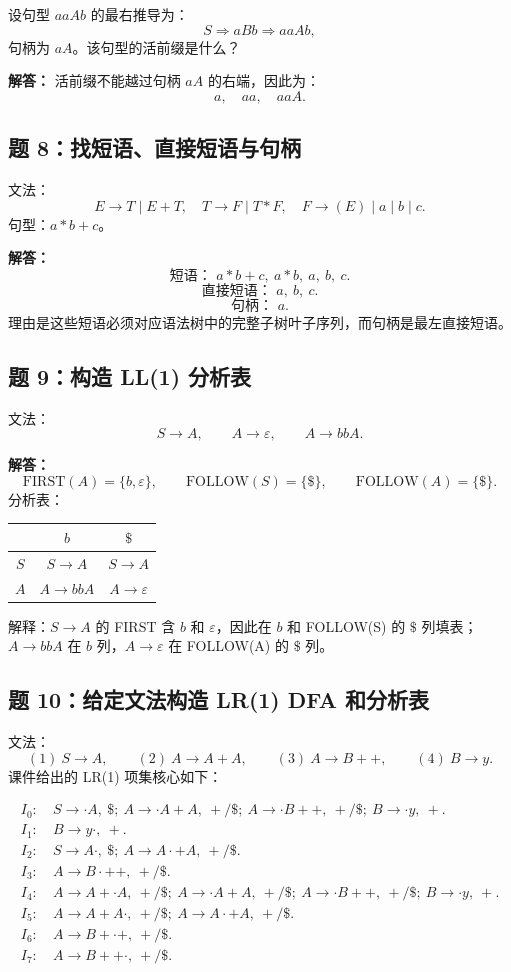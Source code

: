 \documentclass[UTF8,fontset=none,11pt]{ctexart}
\newcommand{\eps}{\varepsilon}
\newcommand{\FIRST}{\ensuremath{\mathrm{FIRST}}}
\newcommand{\FOLLOW}{\ensuremath{\mathrm{FOLLOW}}}
\begin{document}
设句型 \(aaAb\) 的最右推导为：
\[
S\Rightarrow aBb\Rightarrow aaAb,
\]
句柄为 \(aA\)。该句型的活前缀是什么？

\textbf{解答：} 活前缀不能越过句柄 \(aA\) 的右端，因此为：
\[
a,\quad aa,\quad aaA.
\]

\subsection*{题 8：找短语、直接短语与句柄}

文法：
\[
E\to T\mid E+T,\quad T\to F\mid T*F,\quad F\to (E)\mid a\mid b\mid c.
\]
句型：\(a*b+c\)。

\textbf{解答：}
\[
\text{短语： } a*b+c,\ a*b,\ a,\ b,\ c.
\]
\[
\text{直接短语： } a,\ b,\ c.
\]
\[
\text{句柄： } a.
\]
理由是这些短语必须对应语法树中的完整子树叶子序列，而句柄是最左直接短语。

\subsection*{题 9：构造 LL(1) 分析表}

文法：
\[
S\to A,\qquad A\to\eps,\qquad A\to bbA.
\]

\textbf{解答：}
\[
\FIRST(A)=\{b,\eps\},\qquad \FOLLOW(S)=\{\$\},\qquad \FOLLOW(A)=\{\$\}.
\]
分析表：

\begin{center}
\begin{tabular}{c|cc}
\toprule
 & \(b\) & \(\$\) \\
\midrule
\(S\) & \(S\to A\) & \(S\to A\) \\
\(A\) & \(A\to bbA\) & \(A\to\eps\) \\
\bottomrule
\end{tabular}
\end{center}

解释：\(S\to A\) 的 FIRST 含 \(b\) 和 \(\eps\)，因此在 \(b\) 和 FOLLOW(S) 的 \(\$\) 列填表；\(A\to bbA\) 在 \(b\) 列，\(A\to\eps\) 在 FOLLOW(A) 的 \(\$\) 列。

\subsection*{题 10：给定文法构造 LR(1) DFA 和分析表}

文法：
\[
(1)\ S\to A,\qquad
(2)\ A\to A+A,\qquad
(3)\ A\to B++,\qquad
(4)\ B\to y.
\]
课件给出的 LR(1) 项集核心如下：

\[
\begin{aligned}
I_0:&\ S\to\cdot A,\ \$;\ A\to\cdot A+A,\ +/\$;\ A\to\cdot B++,\ +/\$;\ B\to\cdot y,\ +.\\
I_1:&\ B\to y\cdot,\ +.\\
I_2:&\ S\to A\cdot,\ \$;\ A\to A\cdot +A,\ +/\$.\\
I_3:&\ A\to B\cdot ++,\ +/\$.\\
I_4:&\ A\to A+\cdot A,\ +/\$;\ A\to\cdot A+A,\ +/\$;\ A\to\cdot B++,\ +/\$;\ B\to\cdot y,\ +.\\
I_5:&\ A\to A+A\cdot,\ +/\$;\ A\to A\cdot +A,\ +/\$.\\
I_6:&\ A\to B+\cdot +,\ +/\$.\\
I_7:&\ A\to B++\cdot,\ +/\$.
\end{aligned}
\]
\end{document}
